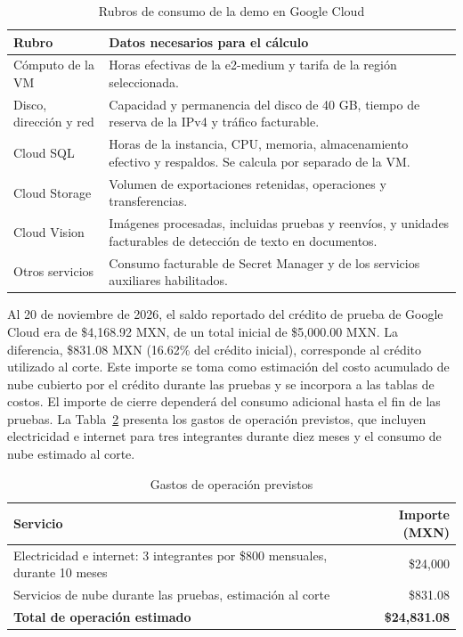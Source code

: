 \begin{table}[H]
\centering
\caption{Rubros de consumo de la demo en Google Cloud}
\label{tab:rubros-nube}
\begin{tabular}{|p{3.6cm}|p{11cm}|}
\hline
\textbf{Rubro} & \textbf{Datos necesarios para el cálculo} \\ \hline

Cómputo de la VM & Horas efectivas de la e2-medium y tarifa de la región seleccionada. \\ \hline
Disco, dirección y red & Capacidad y permanencia del disco de 40 GB, tiempo de reserva de la IPv4 y tráfico facturable. \\ \hline
Cloud SQL & Horas de la instancia, CPU, memoria, almacenamiento efectivo y respaldos. Se calcula por separado de la VM. \\ \hline
Cloud Storage & Volumen de exportaciones retenidas, operaciones y transferencias. \\ \hline
Cloud Vision & Imágenes procesadas, incluidas pruebas y reenvíos, y unidades facturables de detección de texto en documentos. \\ \hline
Otros servicios & Consumo facturable de Secret Manager y de los servicios auxiliares habilitados. \\ \hline
\end{tabular}
\end{table}

Al 20 de noviembre de 2026, el saldo reportado del crédito de prueba de Google Cloud era de \$4{,}168.92 MXN, de un total inicial de \$5{,}000.00 MXN. La diferencia, \$831.08 MXN (16.62\% del crédito inicial), corresponde al crédito utilizado al corte. Este importe se toma como estimación del costo acumulado de nube cubierto por el crédito durante las pruebas y se incorpora a las tablas de costos. El importe de cierre dependerá del consumo adicional hasta el fin de las pruebas.
La Tabla~\ref{tab:servicios} presenta los gastos de operación previstos, que incluyen electricidad e internet para tres integrantes durante diez meses y el consumo de nube estimado al corte.

\begin{table}[H]
\centering
\caption{Gastos de operación previstos}
\label{tab:servicios}
\begin{tabularx}{\textwidth}{|X|r|}
\hline
\textbf{Servicio} & \textbf{Importe (MXN)} \\ \hline
Electricidad e internet: 3 integrantes por \$800 mensuales, durante 10 meses & \$24{,}000 \\ \hline
Servicios de nube durante las pruebas, estimación al corte & \$831.08 \\ \hline
\textbf{Total de operación estimado} & \textbf{\$24{,}831.08} \\ \hline
\end{tabularx}
\end{table}

